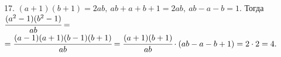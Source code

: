 17. $(a+1)(b+1)=2ab,\ ab+a+b+1=2ab,\ ab-a-b=1.$ Тогда $\cfrac{(a^2-1)(b^2-1)}{ab}=$\\$=\cfrac{(a-1)(a+1)(b-1)(b+1)}{ab}=\cfrac{(a+1)(b+1)}{ab}\cdot(ab-a-b+1)=2\cdot2=4.$\\
